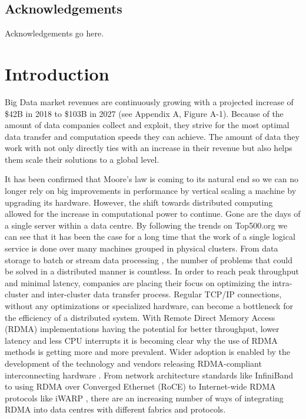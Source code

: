 \documentclass[bsc,frontabs,twoside,singlespacing,parskip,deptreport,hidel]{infthesis}     %
\begin{document}
\maketitle

\section*{Acknowledgements}
Acknowledgements go here. 

\tableofcontents


\chapter{Introduction}

Big Data market revenues are continuously growing with a projected increase of \$42B in 2018 to \$103B in 2027 \cite{statista_market_forecast:online} (see Appendix A, Figure A-1). Because of the amount of data companies collect and exploit, they strive for the most optimal data transfer and computation speeds they can achieve. The amount of data they work with not only directly ties with an increase in their revenue but also helps them scale their solutions to a global level. 

It has been confirmed that Moore's law is coming to its natural end \cite{MooresLaw_techworld:online,MooresLaw_mit_techreview:online} so we can no longer rely on big improvements in performance by vertical scaling a machine by upgrading its hardware. However, the shift towards distributed computing allowed for the increase in computational power to continue. Gone are the days of a single server within a data centre. By following the trends on Top500.org \cite{top500:online} we can see that it has been the case for a long time that the work of a single logical service is done over many machines grouped in physical clusters. From data storage \cite{corbett2013spanner} to batch or stream data processing \cite{lambdaws:online}, the number of problems that could be solved in a distributed manner is countless. In order to reach peak throughput and minimal latency, companies are placing their focus on optimizing the intra-cluster and inter-cluster data transfer process.  Regular TCP/IP connections, without any optimizations or specialized hardware, can become a bottleneck for the efficiency of a distributed system. With Remote Direct Memory Access (RDMA) implementations having the potential for better throughput, lower latency and less CPU interrupts \cite{oberg2006evaluation} it is becoming clear why the use of RDMA methods is getting more and more prevalent.  Wider adoption is enabled by the development of the technology and vendors releasing RDMA-compliant interconnecting hardware \cite{cisco2018RoCE}. From network architecture standards like InfiniBand \cite{pfister2001infiniband} to using RDMA over Converged Ethernet (RoCE) \cite{mellanox2016roce} to Internet-wide RDMA protocols like iWARP \cite{intel2015iwarp}, there are an increasing number of ways of integrating RDMA into data centres with different fabrics and protocols.
\end{document}
